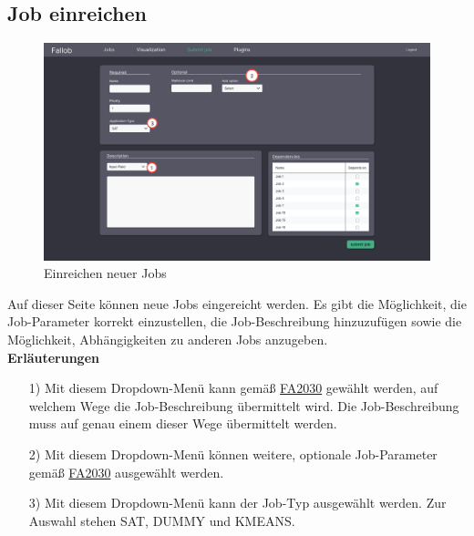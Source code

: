 \subsection{Job einreichen}
\label{pages:submit-job}
\begin{figure}[H]
    \centering
    \includegraphics[width=\textwidth]{images-interface/v4_interface/submit_job_page_4.pdf}
    \caption{Einreichen neuer Jobs}
    \label{fig:submit-job}
\end{figure}
Auf dieser Seite können neue Jobs eingereicht werden. Es gibt die Möglichkeit, die Job-Parameter korrekt einzustellen, die Job-Beschreibung hinzuzufügen sowie die Möglichkeit, Abhängigkeiten zu anderen Jobs anzugeben. \\

\textbf{Erläuterungen}
\begin{itemize}
    \item[1)] Mit diesem Dropdown-Menü kann gemäß \hyperref[FA:Web-Interface:Job einreichen]{FA2030} gewählt werden, auf welchem Wege die Job-Beschreibung übermittelt wird. Die Job-Beschreibung muss auf genau einem dieser Wege übermittelt werden.
    \item[2)] Mit diesem Dropdown-Menü können weitere, optionale Job-Parameter gemäß \hyperref[FA:Web-Interface:Job einreichen]{FA2030} ausgewählt werden. 
    \item[3)] Mit diesem Dropdown-Menü kann der Job-Typ ausgewählt werden. Zur Auswahl stehen SAT, DUMMY und KMEANS.
\end{itemize}

\newpage
